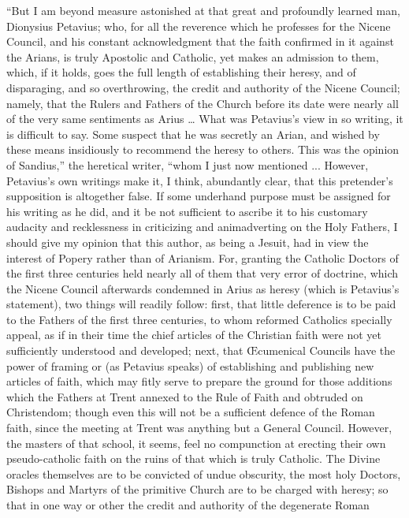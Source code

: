 ``But I am beyond measure astonished at that great and
profoundly learned man, Dionysius Petavius; who, for all the reverence
which he professes for the Nicene Council, and his constant
acknowledgment that the faith confirmed in it against the Arians, is
truly Apostolic and Catholic, yet makes an admission to them, which,
if it holds, goes the full length of establishing their heresy, and of
disparaging, and so overthrowing, the credit and authority of the
Nicene Council; namely, that the Rulers and Fathers of the Church
before its date were nearly all of the very same sentiments as Arius
… What was Petavius's view in so writing, it is difficult to say.
Some suspect that he was secretly an Arian, and wished by these means
insidiously to recommend the heresy to others. This was the opinion of
Sandius,'' the heretical writer, ``whom I just now mentioned
... However, Petavius's own writings make it, I think, abundantly
clear, that this pretender's supposition is altogether false. If some
underhand purpose must be assigned for his writing as he did, and
it be not sufficient to ascribe it to his customary audacity and
recklessness in criticizing and animadverting on the Holy Fathers, I
should give my opinion that this author, as being a Jesuit, had in
view the interest of Popery rather than of Arianism. For, granting the
Catholic Doctors of the first three centuries held nearly all of them
that very error of doctrine, which the Nicene Council afterwards
condemned in Arius as heresy (which is Petavius's statement), two
things will readily follow: first, that little deference is to be paid
to the Fathers of the first three centuries, to whom reformed
Catholics specially appeal, as if in their time the chief articles of
the Christian faith were not yet sufficiently understood and
developed; next, that Œcumenical Councils have the power of framing
or (as Petavius speaks) of establishing and publishing new articles of
faith, which may fitly serve to prepare the ground for those additions
which the Fathers at Trent annexed to the Rule of Faith and obtruded
on Christendom; though even this will not be a sufficient defence of
the Roman faith, since the meeting at Trent was anything but a General
Council. However, the masters of that school, it seems, feel no
compunction at erecting their own pseudo-catholic faith on the ruins
of that which is truly Catholic. The Divine oracles themselves are to
be convicted of undue obscurity, the most holy Doctors, Bishops and
Martyrs of the primitive Church are to be charged with heresy; so that
in one way or other the credit and authority of the degenerate Roman
